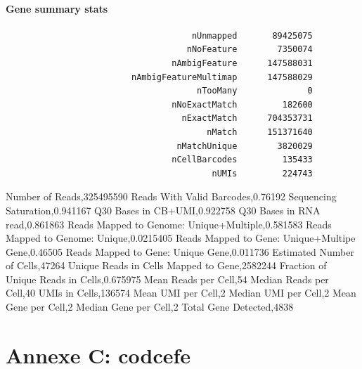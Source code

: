 \documentclass[
  11pt,
  a4paper,
]{report}
\begin{document}
\subsubsection{Gene summary stats}\label{gene-summary-stats}

\begin{verbatim}
                                     nUnmapped       89425075
                                    nNoFeature        7350074
                                 nAmbigFeature      147588031
                         nAmbigFeatureMultimap      147588029
                                      nTooMany              0
                                 nNoExactMatch         182600
                                   nExactMatch      704353731
                                        nMatch      151371640
                                  nMatchUnique        3820029
                                 nCellBarcodes         135433
                                         nUMIs         224743
\end{verbatim}

Number of Reads,325495590 Reads With Valid Barcodes,0.76192 Sequencing
Saturation,0.941167 Q30 Bases in CB+UMI,0.922758 Q30 Bases in RNA
read,0.861863 Reads Mapped to Genome: Unique+Multiple,0.581583 Reads
Mapped to Genome: Unique,0.0215405 Reads Mapped to Gene: Unique+Multipe
Gene,0.46505 Reads Mapped to Gene: Unique Gene,0.011736 Estimated Number
of Cells,47264 Unique Reads in Cells Mapped to Gene,2582244 Fraction of
Unique Reads in Cells,0.675975 Mean Reads per Cell,54 Median Reads per
Cell,40 UMIs in Cells,136574 Mean UMI per Cell,2 Median UMI per Cell,2
Mean Gene per Cell,2 Median Gene per Cell,2 Total Gene Detected,4838

\chapter{Annexe C: codcefe}\label{annexe-c}

\clearpage
\thispagestyle{empty}
\vspace*{\fill}
\vspace*{\fill}
\clearpage
\end{document}
